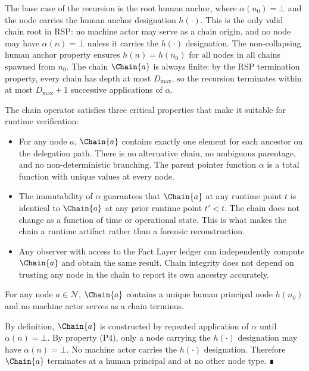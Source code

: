 The base case of the recursion is the root human anchor, where $\alpha(n_0) = \bot$ and the node carries the human anchor designation $h(\cdot)$. This is the only valid chain root in RSP: no machine actor may serve as a chain origin, and no node may have $\alpha(n) = \bot$ unless it carries the $h(\cdot)$ designation. The non-collapsing human anchor property ensures $h(n) = h(n_0)$ for all nodes in all chains spawned from $n_0$. The chain $\Chain{a}$ is always finite: by the RSP termination property, every chain has depth at most $D_{\max}$, so the recursion terminates within at most $D_{\max} + 1$ successive applications of $\alpha$.

The chain operator satisfies three critical properties that make it suitable for runtime verification:

\begin{itemize}
    \item[(C1) \textbf{Determinism}] For any node $a$, $\Chain{a}$ contains exactly one element for each ancestor on the delegation path. There is no alternative chain, no ambiguous parentage, and no non-deterministic branching. The parent pointer function $\alpha$ is a total function with unique values at every node.

    \item[(C2) \textbf{Stability}] The immutability of $\alpha$ guarantees that $\Chain{a}$ at any runtime point $t$ is identical to $\Chain{a}$ at any prior runtime point $t' < t$. The chain does not change as a function of time or operational state. This is what makes the chain a runtime artifact rather than a forensic reconstruction.

    \item[(C3) \textbf{Verifiability}] Any observer with access to the Fact Layer ledger can independently compute $\Chain{a}$ and obtain the same result. Chain integrity does not depend on trusting any node in the chain to report its own ancestry accurately.
\end{itemize}

\begin{corol}
\label{corol:chain-terminates-human}
For any node $a \in \mathcal{N}$, $\Chain{a}$ contains a unique human principal node $h(n_0)$ and no machine actor serves as a chain terminus.
\end{corol}

\begin{pf}
By definition, $\Chain{a}$ is constructed by repeated application of $\alpha$ until $\alpha(n) = \bot$. By property (P4), only a node carrying the $h(\cdot)$ designation may have $\alpha(n) = \bot$. No machine actor carries the $h(\cdot)$ designation. Therefore $\Chain{a}$ terminates at a human principal and at no other node type. ∎
\end{pf}

